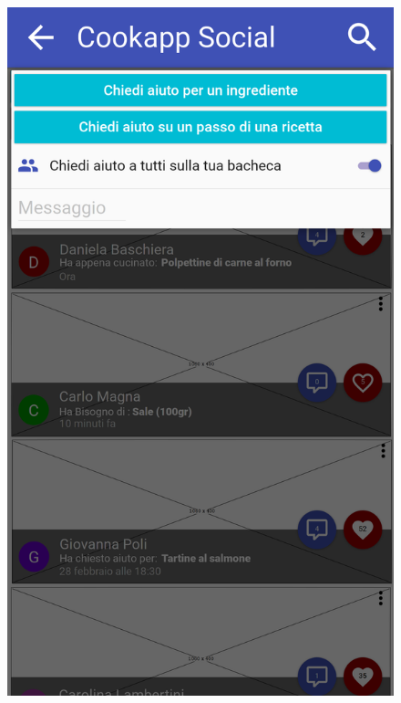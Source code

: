 \begin{figure}[H]
\begin{minipage}{.49\textwidth}
		\includegraphics[width=\textwidth]{img/wireframe/chiedi_aiuto_social_a_tutti.png}
	\end{minipage}
\end{figure}
